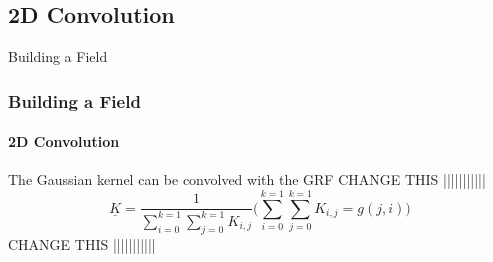 \documentclass[professionalfont,10pt]{beamer}
\begin{document}
	\subsection{2D Convolution}
	\begin{frame}[t]{Building a Field}
	\frametitle{Building a Field}
	\framesubtitle{2D Convolution}
	\hskip-0.75cm
	\begin{minipage}[t]{0.2\linewidth}\vspace{-0.5cm}
		\tiny\tableofcontents[currentsection,currentsubsection,hideothersubsections,subsectionstyle=show/shaded]
	\end{minipage}
	\hfill%
	\begin{minipage}[t]{0.86\linewidth}\vspace{-0.5cm}
		\begin{flushleft}
			\begin{itemize}
				The Gaussian kernel can be convolved with the GRF
				CHANGE THIS |||||||||||
				\begin{equation}
				\underline{K} = \frac{1}{\sum_{i=0}^{k=1}\sum_{j=0}^{k=1} K_{i, j}}\Bigg(\sum_{i=0}^{k=1}\sum_{j=0}^{k=1} K_{i, j} = g(j, i)\Bigg)
				\end{equation}
				CHANGE THIS |||||||||||
			\end{itemize}
		\end{flushleft}
	\end{minipage}
	\vfill%
	\end{frame}
	
\end{document}
